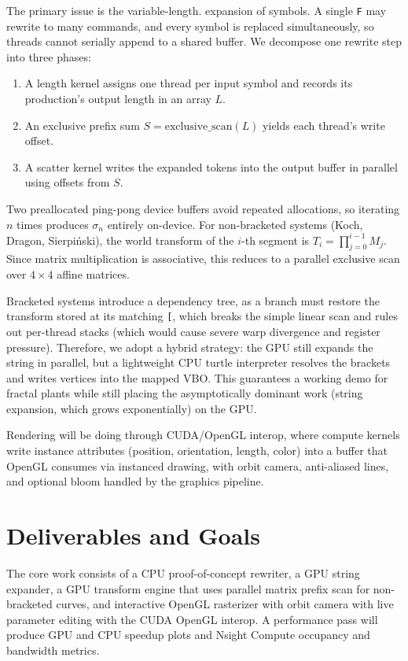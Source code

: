 \documentclass[12pt]{article}
\begin{document}
The primary issue is the variable-length. expansion of symbols. A single \texttt{F} may rewrite to many commands, and every symbol is replaced simultaneously, so threads cannot serially append to a shared buffer. We decompose one rewrite step into three phases:
\begin{enumerate}
    \item A length kernel assigns one thread per input symbol and records its production's output length in an array $L$.
    \item An exclusive prefix sum $S = \text{exclusive\_scan}(L)$ yields each thread's write offset.
    \item A scatter kernel writes the expanded tokens into the output buffer in parallel using offsets from $S$.
\end{enumerate}
Two preallocated ping-pong device buffers avoid repeated allocations, so iterating $n$ times produces $\sigma_n$ entirely on-device. For non-bracketed systems (Koch, Dragon, Sierpi\'nski), the world transform of the $i$-th segment is $T_i = \prod_{j=0}^{i-1} M_j$. Since matrix multiplication is associative, this reduces to a parallel exclusive scan over $4\times4$ affine matrices.

Bracketed systems introduce a dependency tree, as a branch must restore the transform stored at its matching \texttt{[}, which breaks the simple linear scan and rules out per-thread stacks (which would cause severe warp divergence and register pressure). Therefore, we adopt a hybrid strategy: the GPU still expands the string in parallel, but a lightweight CPU turtle interpreter resolves the brackets and writes vertices into the mapped VBO. This guarantees a working demo for fractal plants while still placing the asymptotically dominant work (string expansion, which grows exponentially) on the GPU.

Rendering will be doing through CUDA/OpenGL interop, where compute kernels write instance attributes (position, orientation, length, color) into a buffer that OpenGL consumes via instanced drawing, with orbit camera, anti-aliased lines, and optional bloom handled by the graphics pipeline.
 
\section{Deliverables and Goals}

The core work consists of a CPU proof-of-concept rewriter, a GPU string expander, a GPU transform engine that uses parallel matrix prefix scan for non-bracketed curves, and interactive OpenGL rasterizer with orbit camera with live parameter editing with the CUDA OpenGL interop. A performance pass will produce GPU and CPU speedup plots and Nsight Compute occupancy and bandwidth metrics.
\end{document}
